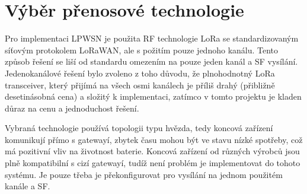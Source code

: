 \section{Výběr přenosové technologie}
Pro implementaci LPWSN je použita RF technologie LoRa se standardizovaným síťovým protokolem LoRaWAN, ale s požitím pouze jednoho kanálu.
Tento způsob řešení se liší od standardu omezením na pouze jeden kanál a SF vysílání.
Jedenokanálové řešení bylo zvoleno z toho důvodu, že plnohodnotný LoRa transceiver, který přijímá na všech osmi kanálech je příliš drahý (přibližně desetinásobná cena) a složitý k implementaci, zatímco v tomto projektu je kladen důraz na cenu a jednoduchost řešení.

Vybraná technologie používá topologii typu hvězda, tedy koncová zařízení komunikují přímo s gatewayí, 
zbytek času mohou být ve stavu nízké spotřeby, což má pozitivní vliv na životnost baterie.
Koncová zařízení od různých výrobců jsou plně kompatibilní s cizí gatewayí, tudíž není problém je implementovat do tohoto systému. 
Je pouze třeba je překonfigurovat pro vysílání na jednom použitém kanále a SF.





